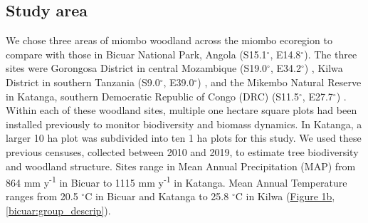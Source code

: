 \begin{refsection}
\subsection{Study area}
\label{bicuar:ssec:plot_loc}

We chose three areas of miombo woodland across the miombo ecoregion to compare with those in Bicuar National Park, Angola (S15.1$^\circ$, E14.8$^\circ$). The three sites were Gorongosa District in central Mozambique (S19.0$^\circ$, E34.2$^\circ$) \citep{Ryan2011}, Kilwa District in southern Tanzania (S9.0$^\circ$, E39.0$^\circ$) \citep{McNicol2018a}, and the Mikembo Natural Reserve in Katanga, southern Democratic Republic of Congo (DRC) (S11.5$^\circ$, E27.7$^\circ$) \citep{Muledi2017}. Within each of these woodland sites, multiple one hectare square plots had been installed previously to monitor biodiversity and biomass dynamics. In Katanga, a larger 10 ha plot was subdivided into ten 1 ha plots for this study. We used these previous censuses, collected between 2010 and 2019, to estimate tree biodiversity and woodland structure. Sites range in Mean Annual Precipitation (MAP) from 864 mm y\textsuperscript{-1} in Bicuar to 1115 mm y\textsuperscript{-1} in Katanga. Mean Annual Temperature ranges from \textapprox{}20.5 $^\circ$C in Bicuar and Katanga to \textapprox{}25.8 $^\circ$C in Kilwa (\hyperref[temp_precip]{Figure 1b}, \autoref{bicuar:group_descrip}).


\end{refsection}

